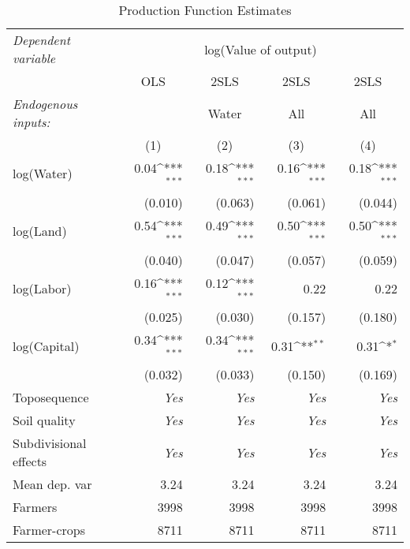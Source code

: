 \begin{table}[!ht]
	\centering
		\caption{Production Function Estimates} \label{tab:prodFunc}
	\def\sym#1{\ifmmode^{#1}\else\(^{#1}\)\fi}
	\begin{tabular}{lrrrr}
		\toprule
\multicolumn{1}{l}{\emph{Dependent variable}} &\multicolumn{4}{c}{log(Value of output)} \\
\cmidrule(lr){2-5}
&\multicolumn{1}{c}{OLS}&\multicolumn{1}{c}{2SLS}&\multicolumn{1}{c}{2SLS}&\multicolumn{1}{c}{2SLS}\\
\cmidrule(lr){2-2}\cmidrule(lr){3-3}\cmidrule(lr){4-4}\cmidrule(lr){5-5}
\multicolumn{1}{l}{\emph{Endogenous inputs:}}&\multicolumn{1}{c}{ }&\multicolumn{1}{c}{Water}&\multicolumn{1}{c}{All}&\multicolumn{1}{c}{All}\\
&\multicolumn{1}{c}{(1)}&\multicolumn{1}{c}{(2)}&\multicolumn{1}{c}{(3)}&\multicolumn{1}{c}{(4)}\\
		\midrule
		     log(Water)&0.04\sym{***}&0.18\sym{***}&0.16\sym{***}&0.18\sym{***}\\
		               &(0.010)&(0.063)&(0.061)&(0.044)\\
		 \addlinespace 
		      log(Land)&0.54\sym{***}&0.49\sym{***}&0.50\sym{***}&0.50\sym{***}\\
		               &(0.040)&(0.047)&(0.057)&(0.059)\\
		 \addlinespace 
		     log(Labor)&0.16\sym{***}&0.12\sym{***}&0.22&0.22\\
		               &(0.025)&(0.030)&(0.157)&(0.180)\\
		 \addlinespace 
		   log(Capital)&0.34\sym{***}&0.34\sym{***}&0.31\sym{**}&0.31\sym{*}\\
		               &(0.032)&(0.033)&(0.150)&(0.169)\\
		 \addlinespace 
		 \addlinespace 
		   Toposequence&\emph{Yes}&\emph{Yes}&\emph{Yes}&\emph{Yes}\\
		   Soil quality&\emph{Yes}&\emph{Yes}&\emph{Yes}&\emph{Yes}\\
		Subdivisional effects&\emph{Yes}&\emph{Yes}&\emph{Yes}&\emph{Yes}\\
		 \addlinespace 
		 \addlinespace 
		  Mean dep. var&3.24&3.24&3.24&3.24\\
		        Farmers&3998&3998&3998&3998\\
		   Farmer-crops&8711&8711&8711&8711\\
		\bottomrule

\end{tabular}
\end{table}
